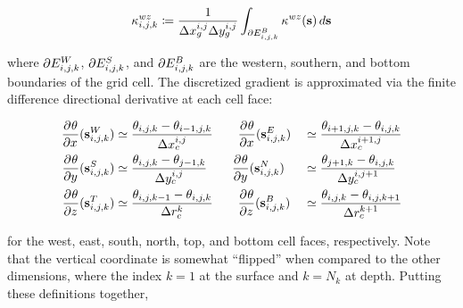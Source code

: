 \begin{linenomath*}\begin{equation*}
    \kappa^{wz}_{{i,j,k}} \coloneqq \dfrac{1}{\Delta x_g^{i,j}\Delta y_g^{i,j}}
    \int_{\partial E_{{i,j,k}}^{B}} \kappa^{wz}(\mathbf{s})\,d\mathbf{s}
\end{equation*}\end{linenomath*}
where $\partial E_{{i,j,k}}^{W}$, $\partial E_{{i,j,k}}^{S}$, and $\partial E_{{i,j,k}}^{B}$ are the
western, southern, and bottom boundaries of the grid cell.
The discretized gradient is approximated via the finite difference
directional derivative at each cell face:
\begin{linenomath*}\begin{equation*}
    \begin{aligned}
        \frac{\partial^{} {\theta}}{\partial {x}^{}}(\mathbf{s}_{i,j,k}^W)
        &\simeq \dfrac{\theta_{i,j,k} - \theta_{i-1,j,k}}{\Delta x_c^{i,j}}
        \qquad
        \frac{\partial^{} {\theta}}{\partial {x}^{}}(\mathbf{s}_{i,j,k}^E)
        &&\simeq \dfrac{\theta_{i+1,j,k} - \theta_{i,j,k}}{\Delta x_c^{i+1,j}}
        \\
        \frac{\partial^{} {\theta}}{\partial {y}^{}}(\mathbf{s}_{i,j,k}^S)
        &\simeq \dfrac{\theta_{i,j,k} - \theta_{j-1,k}}{\Delta y_c^{i,j}}
        \qquad
        \frac{\partial^{} {\theta}}{\partial {y}^{}}(\mathbf{s}_{i,j,k}^N)
        &&\simeq \dfrac{\theta_{j+1,k} - \theta_{i,j,k}}{\Delta y_c^{i,j+1}}
        \\
        \frac{\partial^{} {\theta}}{\partial {z}^{}}(\mathbf{s}_{i,j,k}^T)
        &\simeq \dfrac{\theta_{i,j,k-1} - \theta_{i,j,k}}{\Delta r_c^{k}}
        \qquad
        \frac{\partial^{} {\theta}}{\partial {z}^{}}(\mathbf{s}_{i,j,k}^B)
        &&\simeq \dfrac{\theta_{i,j,k} - \theta_{i,j,k+1}}{\Delta r_c^{k+1}}
    \end{aligned}
\end{equation*}\end{linenomath*}
for the west, east, south, north, top, and bottom cell faces, respectively.
Note that the vertical coordinate is somewhat ``flipped'' when compared to the
other dimensions, where the index $k=1$ at the surface and $k=N_k$ at depth.
Putting these definitions together,
